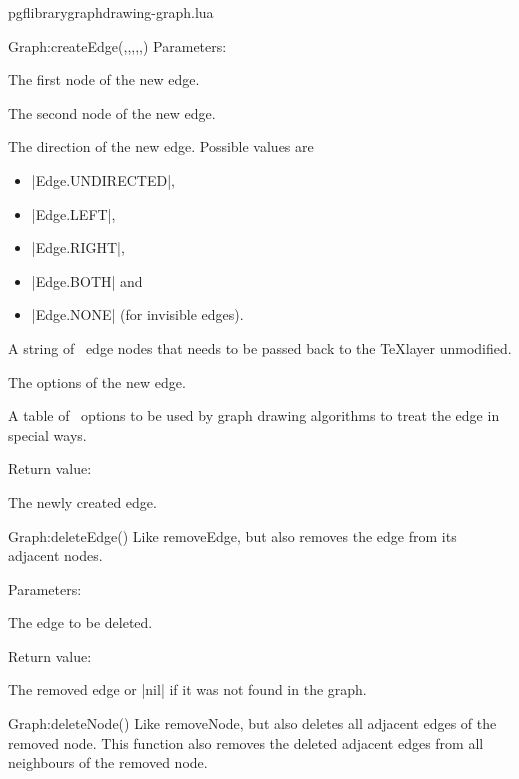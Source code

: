 \begin{filedescription}{pgflibrarygraphdrawing-graph.lua}
\begin{luacommand}{{Graph:createEdge}(,,,,,)}
Parameters:
\begin{parameterdescription}
	\item[\meta{first\_node}] The first node of the new edge.\item[\meta{second\_node}] The second node of the new edge.\item[\meta{direction}] The direction of the new edge. Possible values are \begin{itemize} \item |Edge.UNDIRECTED|, \item |Edge.LEFT|, \item |Edge.RIGHT|, \item |Edge.BOTH| and \item |Edge.NONE| (for invisible edges). \end{itemize}\item[\meta{edge\_nodes}] A string of \tikzname\ edge nodes that needs to be passed back to the \TeX layer unmodified.\item[\meta{options}] The options of the new edge.\item[\meta{tikz\_options}] A table of \tikzname\ options to be used by graph drawing algorithms to treat the edge in special ways. 
\end{parameterdescription}


Return value:
\begin{parameterdescription} 
  \item[] The newly created edge. 
\end{parameterdescription}


\end{luacommand}
\begin{luacommand}{{Graph:deleteEdge}()}
Like removeEdge, but also removes the edge from its adjacent nodes. 

Parameters:
\begin{parameterdescription}
	\item[\meta{edge}] The edge to be deleted. 
\end{parameterdescription}


Return value:
\begin{parameterdescription} 
  \item[] The removed edge or |nil| if it was not found in the graph. 
\end{parameterdescription}


\end{luacommand}
\begin{luacommand}{{Graph:deleteNode}()}
Like removeNode, but also deletes all adjacent edges of the removed node.  This function also removes the deleted adjacent edges from all neighbours of the removed node. 


\end{luacommand}
\end{filedescription}
